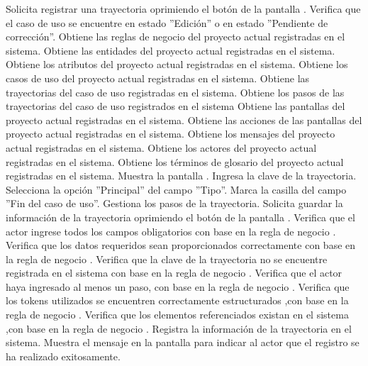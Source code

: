 	\begin{UCtrayectoria}
		\UCpaso[\UCactor] Solicita registrar una trayectoria oprimiendo el botón  de la pantalla .
		\UCpaso[\UCactor] Verifica que el caso de uso se encuentre en estado ''Edición'' o en estado ''Pendiente de corrección''. 
		\UCpaso[\UCsist] Obtiene las reglas de negocio del proyecto actual registradas en el sistema.
		\UCpaso[\UCsist] Obtiene las entidades del proyecto actual registradas en el sistema.
		\UCpaso[\UCsist] Obtiene los atributos del proyecto actual registradas en el sistema.
		\UCpaso[\UCsist] Obtiene los casos de uso del proyecto actual registradas en el sistema.
		\UCpaso[\UCsist] Obtiene las trayectorias del caso de uso registradas en el sistema.
		\UCpaso[\UCsist] Obtiene los pasos de las trayectorias del caso de uso registrados en el sistema
		\UCpaso[\UCsist] Obtiene las pantallas del proyecto actual registradas en el sistema.
		\UCpaso[\UCsist] Obtiene las acciones de las pantallas del proyecto actual registradas en el sistema.
		\UCpaso[\UCsist] Obtiene los mensajes del proyecto actual registradas en el sistema.
		\UCpaso[\UCsist] Obtiene los actores del proyecto actual registradas en el sistema.
		\UCpaso[\UCsist] Obtiene los términos de glosario del proyecto actual registradas en el sistema.
		\UCpaso[\UCsist] Muestra la pantalla .
		\UCpaso[\UCactor] Ingresa la clave de la trayectoria. 
		\UCpaso[\UCactor] Selecciona la opción ''Principal'' del campo ''Tipo''.  \label{CU12.1.1.1-P16}
		\UCpaso[\UCsist] Marca la casilla del campo ''Fin del caso de uso''.
		\UCpaso[\UCactor] Gestiona los pasos de la trayectoria. \label{CU12.1.1.1-P18}
		\UCpaso[\UCactor] Solicita guardar la información de la trayectoria oprimiendo el botón  de la pantalla .  
		\UCpaso[\UCsist] Verifica que el actor ingrese todos los campos obligatorios con base en la regla de negocio . 
		\UCpaso[\UCsist] Verifica que los datos requeridos sean proporcionados correctamente con base en la regla de negocio .   
		\UCpaso[\UCsist] Verifica que la clave de la trayectoria no se encuentre registrada en el sistema con base en la regla de negocio .  
		\UCpaso[\UCsist] Verifica que el actor haya ingresado al menos un paso, con base en la regla de negocio . 
		\UCpaso[\UCsist] Verifica que los tokens utilizados se encuentren correctamente estructurados ,con base en la regla de negocio . 
		\UCpaso[\UCsist] Verifica que los elementos referenciados existan en el sistema ,con base en la regla de negocio . 
		\UCpaso[\UCsist] Registra la información de la trayectoria en el sistema.
		\UCpaso[\UCsist] Muestra el mensaje  en la pantalla  para indicar al actor que el registro se ha realizado exitosamente.
	\end{UCtrayectoria}		

